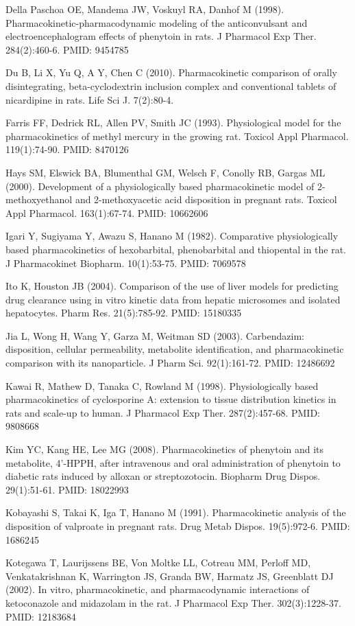 \documentclass[a4paper]{book}
\begin{document}
\begin{References}
Della Paschoa OE, Mandema JW, Voskuyl RA, Danhof M (1998).
Pharmacokinetic-pharmacodynamic modeling of the anticonvulsant and
electroencephalogram effects of phenytoin in rats. J Pharmacol Exp Ther.
284(2):460-6. PMID: 9454785

Du B, Li X, Yu Q, A Y, Chen C (2010). Pharmacokinetic comparison of orally
disintegrating, beta-cyclodextrin inclusion complex and conventional tablets
of nicardipine in rats. Life Sci J. 7(2):80-4.

Farris FF, Dedrick RL, Allen PV, Smith JC (1993). Physiological model for
the pharmacokinetics of methyl mercury in the growing rat. Toxicol Appl
Pharmacol. 119(1):74-90. PMID: 8470126

Hays SM, Elswick BA, Blumenthal GM, Welsch F, Conolly RB, Gargas ML (2000).
Development of a physiologically based pharmacokinetic model of
2-methoxyethanol and 2-methoxyacetic acid disposition in pregnant rats.
Toxicol Appl Pharmacol. 163(1):67-74. PMID: 10662606

Igari Y, Sugiyama Y, Awazu S, Hanano M (1982). Comparative physiologically
based pharmacokinetics of hexobarbital, phenobarbital and thiopental in the
rat. J Pharmacokinet Biopharm. 10(1):53-75. PMID: 7069578

Ito K, Houston JB (2004). Comparison of the use of liver models for
predicting drug clearance using in vitro kinetic data from hepatic
microsomes and isolated hepatocytes. Pharm Res. 21(5):785-92. PMID: 15180335

Jia L, Wong H, Wang Y, Garza M, Weitman SD (2003). Carbendazim: disposition,
cellular permeability, metabolite identification, and pharmacokinetic
comparison with its nanoparticle. J Pharm Sci. 92(1):161-72. PMID: 12486692

Kawai R, Mathew D, Tanaka C, Rowland M (1998). Physiologically based
pharmacokinetics of cyclosporine A: extension to tissue distribution
kinetics in rats and scale-up to human. J Pharmacol Exp Ther. 287(2):457-68.
PMID: 9808668

Kim YC, Kang HE, Lee MG (2008). Pharmacokinetics of phenytoin and its
metabolite, 4'-HPPH, after intravenous and oral administration of phenytoin
to diabetic rats induced by alloxan or streptozotocin. Biopharm Drug Dispos.
29(1):51-61. PMID: 18022993

Kobayashi S, Takai K, Iga T, Hanano M (1991). Pharmacokinetic analysis of
the disposition of valproate in pregnant rats. Drug Metab Dispos.
19(5):972-6. PMID: 1686245

Kotegawa T, Laurijssens BE, Von Moltke LL, Cotreau MM, Perloff MD,
Venkatakrishnan K, Warrington JS, Granda BW, Harmatz JS, Greenblatt DJ
(2002). In vitro, pharmacokinetic, and pharmacodynamic interactions of
ketoconazole and midazolam in the rat. J Pharmacol Exp Ther. 302(3):1228-37.
PMID: 12183684


\end{References}
\end{document}
